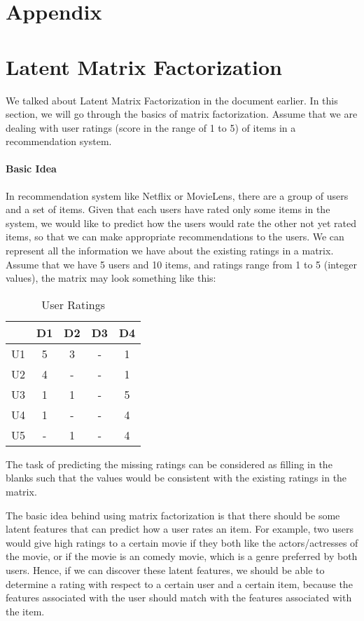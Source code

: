 \newpage
\appendix
\section*{Appendix}
\section{Latent Matrix Factorization}
 We talked about Latent Matrix Factorization in the document earlier. In this section, we will go through the basics of matrix factorization. Assume that we are dealing with user ratings (score in the range of 1 to 5) of items in a recommendation system.

\paragraph{Basic Idea}
 In recommendation system like Netflix or MovieLens, there are a group of users and a set of items. Given that each users have rated only some items in the system, we would like to predict how the users would rate the other not yet rated items, so that we can make appropriate recommendations to the users. We can represent all the information we have about the existing ratings in a matrix. Assume that we have 5 users and 10 items, and ratings range from 1 to 5 (integer values), the matrix may look something like this:

\begin{table}[ht]
\caption{User Ratings}
\centering %
\begin{tabular}{c c c c c}
\hline\hline %
& D1 & D2 & D3 & D4 \\ [0.5ex] %
\hline %
U1 & 5 & 3 & - & 1\\ %
U2 & 4 & - & - & 1\\
U3 & 1 & 1 & - & 5\\
U4 & 1 & - & - & 4\\
U5 & - & 1 & - & 4\\ [1ex] %
\hline %
\end{tabular}
\end{table}

 The task of predicting the missing ratings can be considered as filling in the blanks such that the values would be consistent with the existing ratings in the matrix.
 
 The basic idea behind using matrix factorization is that there should be some latent features that can predict how a user rates an item. For example, two users would give high ratings to a certain movie if they both like the actors/actresses of the movie, or if the movie is an comedy movie, which is a genre preferred by both users. Hence, if we can discover these latent features, we should be able to determine a rating with respect to a certain user and a certain item, because the features associated with the user should match with the features associated with the item.

